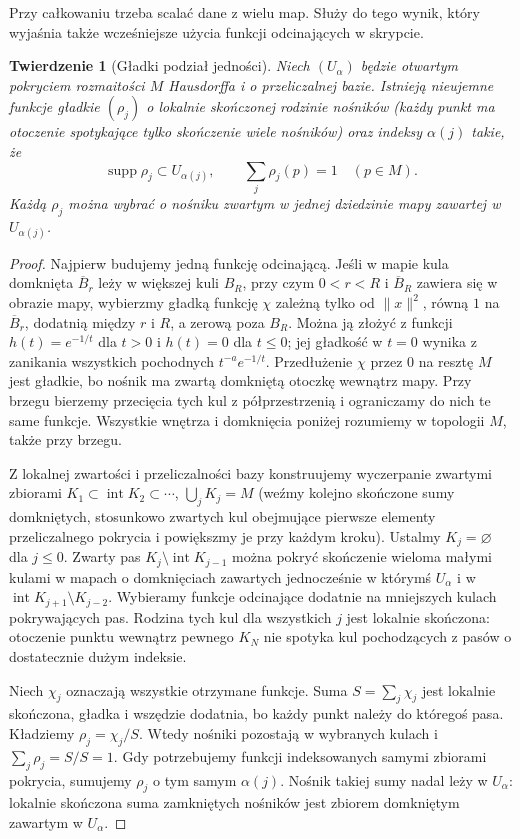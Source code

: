 \documentclass[11pt,a4paper,oneside]{report}
\newcommand{\supp}{\operatorname{supp}}
\theoremstyle{plain}
\newtheorem{twierdzenie}{Twierdzenie}[section]
\theoremstyle{definition}
\theoremstyle{remark}
\begin{document}
Przy całkowaniu trzeba scalać dane z wielu map.
Służy do tego wynik, który wyjaśnia także wcześniejsze
użycia funkcji odcinających w skrypcie.

\begin{twierdzenie}[Gładki podział jedności]
\label{thm:podzial-jednosci-formy}
Niech $(U_\alpha)$ będzie otwartym pokryciem rozmaitości
$M$ Hausdorffa i o przeliczalnej bazie. Istnieją
nieujemne funkcje gładkie $(\rho_j)$ o lokalnie skończonej
rodzinie nośników (każdy punkt ma otoczenie spotykające
tylko skończenie wiele nośników) oraz indeksy $\alpha(j)$ takie, że
\[
 \supp\rho_j\subset U_{\alpha(j)},
 \qquad \sum_j\rho_j(p)=1\quad(p\in M).
\]
Każdą $\rho_j$ można wybrać o nośniku zwartym
w jednej dziedzinie mapy zawartej w $U_{\alpha(j)}$.
\end{twierdzenie}
\begin{proof}
Najpierw budujemy jedną funkcję odcinającą.
Jeśli w mapie kula domknięta $\overline B_r$
leży w większej kuli $B_R$, przy czym $0<r<R$
i $\overline B_R$ zawiera się w obrazie mapy,
wybierzmy gładką funkcję $\chi$ zależną tylko
od $\|x\|^2$, równą $1$ na $\overline B_r$,
dodatnią między $r$ i $R$, a zerową poza $B_R$.
Można ją złożyć z funkcji $h(t)=e^{-1/t}$ dla
$t>0$ i $h(t)=0$ dla $t\leq0$; jej gładkość w
$t=0$ wynika z zanikania wszystkich pochodnych
$t^{-a}e^{-1/t}$. Przedłużenie $\chi$ przez $0$
na resztę $M$ jest gładkie, bo nośnik ma zwartą
domkniętą otoczkę wewnątrz mapy. Przy brzegu bierzemy
przecięcia tych kul z półprzestrzenią i ograniczamy do nich
te same funkcje. Wszystkie wnętrza i domknięcia poniżej
rozumiemy w topologii $M$, także przy brzegu.

Z lokalnej zwartości i przeliczalności bazy
konstruujemy wyczerpanie zwartymi zbiorami
$K_1\subset\operatorname{int}K_2\subset\cdots$,
$\bigcup_jK_j=M$ (weźmy kolejno skończone
sumy domkniętych, stosunkowo zwartych kul
obejmujące pierwsze elementy przeliczalnego
pokrycia i powiększmy je przy każdym kroku).
Ustalmy $K_j=\varnothing$ dla $j\leq0$.
Zwarty pas $K_j\setminus\operatorname{int}K_{j-1}$
można pokryć skończenie wieloma małymi kulami
w mapach o domknięciach zawartych jednocześnie
w którymś $U_\alpha$ i w
$\operatorname{int}K_{j+1}\setminus K_{j-2}$.
Wybieramy funkcje odcinające dodatnie na
mniejszych kulach pokrywających pas.
Rodzina tych kul dla wszystkich $j$ jest
lokalnie skończona: otoczenie punktu wewnątrz
pewnego $K_N$ nie spotyka kul pochodzących
z pasów o dostatecznie dużym indeksie.

Niech $\chi_j$ oznaczają wszystkie otrzymane
funkcje. Suma $S=\sum_j\chi_j$ jest lokalnie
skończona, gładka i wszędzie dodatnia, bo
każdy punkt należy do któregoś pasa. Kładziemy
$\rho_j=\chi_j/S$. Wtedy nośniki pozostają
w wybranych kulach i
$\sum_j\rho_j=S/S=1$.
Gdy potrzebujemy funkcji indeksowanych samymi zbiorami
pokrycia, sumujemy $\rho_j$ o tym samym $\alpha(j)$.
Nośnik takiej sumy nadal leży w $U_\alpha$:
lokalnie skończona suma zamkniętych nośników jest
zbiorem domkniętym zawartym w $U_\alpha$.
\end{proof}
\end{document}
